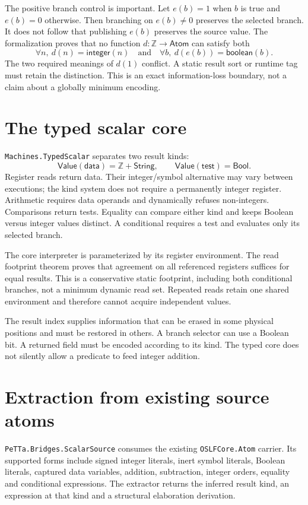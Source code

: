 \documentclass[11pt,a4paper]{article}
\newcommand{\code}[1]{\nolinkurl{#1}}
\begin{document}
The positive branch control is important. Let $e(b)=1$ when $b$ is true and
$e(b)=0$ otherwise. Then branching on $e(b)\ne0$ preserves the selected branch.
It does not follow that publishing $e(b)$ preserves the source value. The
formalization proves that no function $d:\mathbb Z\to\mathsf{Atom}$ can satisfy
both
\[
 \forall n,\ d(n)=\mathsf{integer}(n)
 \quad\text{and}\quad
 \forall b,\ d(e(b))=\mathsf{boolean}(b).
\]
The two required meanings of $d(1)$ conflict. A static result sort or runtime
tag must retain the distinction. This is an exact information-loss boundary,
not a claim about a globally minimum encoding.

\section{The typed scalar core}

\code{Machines.TypedScalar} separates two result kinds:
\[
 \mathsf{Value}(\mathsf{data})=\mathbb Z+\mathsf{String},
 \qquad
 \mathsf{Value}(\mathsf{test})=\mathsf{Bool}.
\]
Register reads return data. Their integer/symbol alternative may vary between
executions; the kind system does not require a permanently integer register.
Arithmetic requires data operands and dynamically refuses non-integers.
Comparisons return tests. Equality can compare either kind and keeps Boolean
versus integer values distinct. A conditional requires a test and evaluates
only its selected branch.

The core interpreter is parameterized by its register environment. The read
footprint theorem proves that agreement on all referenced registers suffices
for equal results. This is a conservative static footprint, including both
conditional branches, not a minimum dynamic read set. Repeated reads retain
one shared environment and therefore cannot acquire independent values.

The result index supplies information that can be erased in some physical
positions and must be restored in others. A branch selector can use a Boolean
bit. A returned field must be encoded according to its kind. The typed core
does not silently allow a predicate to feed integer addition.

\section{Extraction from existing source atoms}

\code{PeTTa.Bridges.ScalarSource} consumes the existing \code{OSLFCore.Atom}
carrier. Its supported forms include signed integer literals, inert symbol
literals, Boolean literals, captured data variables, addition, subtraction,
integer orders, equality and conditional expressions. The extractor returns
the inferred result kind, an expression at that kind and a structural
elaboration derivation.
\end{document}
